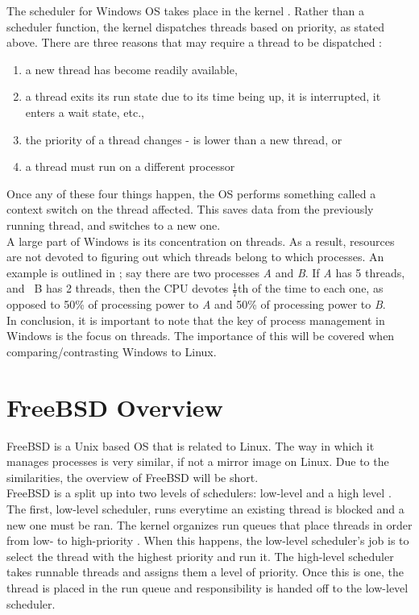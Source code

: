 \documentclass[onecolumn, draftclsnofoot,10pt, compsoc]{IEEEtran}
\begin{document}
	The scheduler for Windows OS takes place in the kernel \cite{windowswebsite}. 
	Rather than a scheduler function, the kernel dispatches threads based on priority, as stated above.
	There are three reasons that may require a thread to be dispatched \cite{windowswebsite}:
	\begin{enumerate}
		\item a new thread has become readily available,
		\item a thread exits its run state due to its time being up, it is interrupted, it enters a wait state, etc.,
		\item the priority of a thread changes - is lower than a new thread, or
		\item a thread must run on a different processor
	\end{enumerate}
	Once any of these four things happen, the OS performs something called a context switch on the thread affected. 
	This saves data from the previously running thread, and switches to a new one. \\

	A large part of Windows is its concentration on threads. 
	As a result, resources are not devoted to figuring out which threads belong to which processes.
	An example is outlined in \cite{windowswebsite};
	say there are two processes \textit A and \textit B. 
	If \textit A has 5 threads, and \textit\ B has 2 threads, then the CPU devotes \(\frac{1}{7}\)th of the time to each one, as opposed to 50\% of processing power to \textit A and 50\% of processing power to \textit B.\\

	In conclusion, it is important to note that the key of process management in Windows is the focus on threads. The importance of this will be covered when comparing/contrasting Windows to Linux.
	
\section{FreeBSD Overview}
	FreeBSD is a Unix based OS that is related to Linux. The way in which it manages processes is very similar, if not a mirror image on Linux. Due to the similarities, the overview of FreeBSD will be short. \\

	FreeBSD is a split up into two levels of schedulers: low-level and a high level \cite{bsdschedule}.
	The first, low-level scheduler, runs everytime an existing thread is blocked and a new one must be ran.
	The kernel organizes run queues that place threads in order from low- to high-priority \cite{bsdschedule}.
	When this happens, the low-level scheduler's job is to select the thread with the highest priority and run it.
	The high-level scheduler takes runnable threads and assigns them a level of priority.
	Once this is one, the thread is placed in the run queue and responsibility is handed off to the low-level scheduler. \\ 
\end{document}
